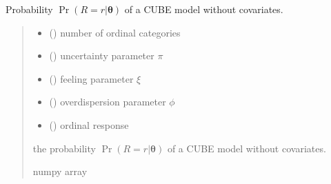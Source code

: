 \documentclass[letterpaper,10pt,english]{sphinxmanual}
\begin{document}
\begin{fulllineitems}
\label{\detokenize{cubmods:cubmods.cube.proba}}
\pysigstartsignatures
{}
\pysigstopsignatures
\sphinxAtStartPar
Probability \(\Pr(R = r | \pmb\theta)\) of a CUBE model without covariates.
\begin{quote}\begin{description}
\begin{itemize}
\item {} 
\sphinxAtStartPar
{} () \textendash{} number of ordinal categories

\item {} 
\sphinxAtStartPar
{} () \textendash{} uncertainty parameter \(\pi\)

\item {} 
\sphinxAtStartPar
{} () \textendash{} feeling parameter \(\xi\)

\item {} 
\sphinxAtStartPar
{} () \textendash{} overdispersion parameter \(\phi\)

\item {} 
\sphinxAtStartPar
{} () \textendash{} ordinal response

\end{itemize}

\sphinxAtStartPar
the probability \(\Pr(R = r | \pmb\theta)\) of a CUBE model without covariates.

\sphinxAtStartPar
numpy array

\end{description}\end{quote}

\end{fulllineitems}

\end{document}
